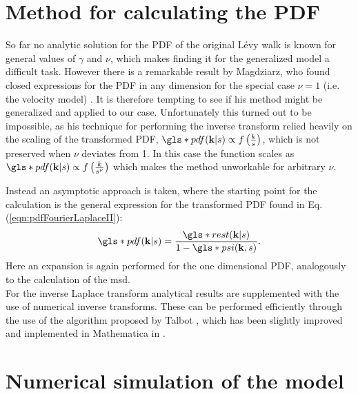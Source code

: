 \section{Method for calculating the PDF}

So far no analytic solution for the \gls*{PDF} of the original L\'evy walk is known for general values of $\gamma$ and $\nu$, which makes finding it for the generalized model a difficult task. However there is a remarkable result by Magdziarz, who found closed expressions for the \gls*{PDF} in any dimension for the special case $\nu=1$ (i.e. the velocity model) 
\cite{magdziarz2015, magdziarz2016}. 
It is therefore tempting to see if his method might be generalized and applied to our case. Unfortunately this turned out to be impossible, as his technique for performing the inverse transform relied heavily on the scaling of the transformed \gls*{PDF}, $\gls*{pdf}(\ve{k}|s) \propto f\left( \frac{k}{s} \right)$, which is not preserved when $\nu$ deviates from 1. In this case the function scales as $\gls*{pdf}(\ve{k}|s) \propto f\left(\frac{k}{s^{\nu}} \right)$ which makes the method unworkable for arbitrary $\nu$.

Instead an asymptotic approach is taken, where the starting point for the calculation is the general expression for the transformed \gls*{PDF} found in  Eq. (\ref{eqn:pdfFourierLaplaceII}):
%
\begin{align}
\gls*{pdf}(\ve{k}|s) = \frac{ \gls*{rest}(\ve{k}|s)}{1 - \gls*{psi}(\ve{k},s)}  .
\end{align}
%
Here an expansion is again performed for the one dimensional PDF, analogously to the calculation of the \gls*{msd}. \\
For the inverse Laplace transform analytical results are supplemented with the use of numerical inverse transforms. These can be performed efficiently through the use of the algorithm proposed by Talbot 
\cite{talbot1979}, 
which has been slightly improved and implemented in Mathematica in 
\cite{abate2004}.


\section{Numerical simulation of the model}

